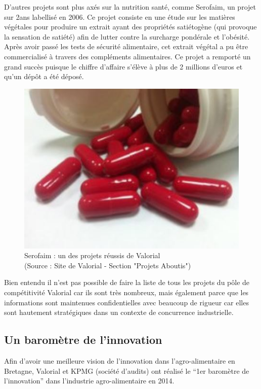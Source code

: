 \documentclass[a4paper,12pt]{report}
\begin{document}
				D’autres projets sont plus axés sur la nutrition santé, comme Serofaim, un projet sur 2ans labellisé en 2006. Ce projet consiste en une étude sur les matières végétales pour produire un extrait ayant des propriétés satiétogène (qui provoque la sensation de satiété) afin de lutter contre la surcharge pondérale et l’obésité. Après avoir passé les tests de sécurité alimentaire, cet extrait végétal a pu être commercialisé à travers des compléments alimentaires. Ce projet a remporté un grand succès puisque le chiffre d’affaire s’élève à plus de 2 millions d’euros et qu’un dépôt a été déposé.
				
		\begin{figure}[!h]
			\centering
			\includegraphics[scale=0.5]{Illustrations/Serofaim.jpg}
			\caption{Serofaim : un des projets réussis de Valorial\\(Source : Site de Valorial - Section "Projets Aboutis"\cite{ProjetsAboutis})}
			\label{Serofaim}
			\end{figure}		

				Bien entendu il n’est pas possible de faire la liste de tous les projets du pôle de compétitivité Valorial car ils sont très nombreux, mais également parce que les informations sont maintenues confidentielles avec beaucoup de rigueur car elles sont hautement stratégiques dans un contexte de concurrence industrielle.

				
		\subsection{Un baromètre de l'innovation}
		
		    Afin d’avoir une meilleure vision de l’innovation dans l’agro-alimentaire en Bretagne, Valorial et KPMG (société d’audits) ont réalisé le “1er baromètre de l’innovation” dans l’industrie agro-alimentaire en 2014. 
\end{document}
